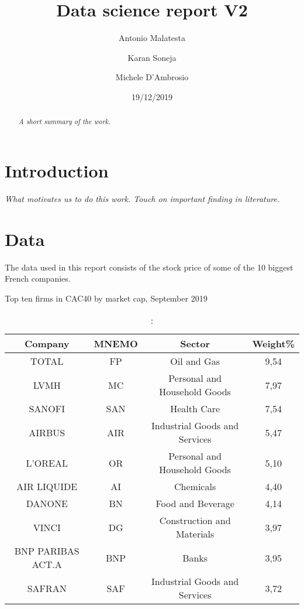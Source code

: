 \documentclass[
  11pt,
]{article}
\title{Data science report V2}
\author{Antonio Malatesta \and Karan Soneja \and Michele D'Ambrosio}
\date{19/12/2019}
\begin{document}
\maketitle
\begin{abstract}
\emph{A short summary of the work.}
\end{abstract}

{
\setcounter{tocdepth}{3}
\tableofcontents
}
\newpage

\hypertarget{introduction}{%
\section{Introduction}\label{introduction}}

\emph{What motivates us to do this work. Touch on important finding in
literature. }

\hypertarget{data}{%
\section{Data}\label{data}}

The data used in this report consists of the stock price of some of the
10 biggest French companies.

\begin{table}[ht]
\caption:{Top ten firms in CAC40 by market cap, September 2019}
\centering
\begin{tabular}{|c|c|c|c|}
  \hline
Company & MNEMO  &  Sector  & Weight\% \\
  \hline
  TOTAL &   FP  & Oil and Gas & 9,54 \\
  LVMH &    MC  & Personal and Household Goods & 7,97 \\
  SANOFI & SAN  & Health Care & 7,54 \\
  AIRBUS & AIR  & Industrial Goods and Services &   5,47 \\
  L'OREAL   & OR  & Personal and Household Goods &  5,10 \\
  AIR LIQUIDE & AI  & Chemicals &   4,40 \\
  DANONE &  BN  & Food and Beverage & 4,14 \\
  VINCI &   DG & Construction and Materials & 3,97 \\
  BNP PARIBAS ACT.A &   BNP  & Banks & 3,95 \\
  SAFRAN & SAF  & Industrial Goods and Services & 3,72 \\
   \hline
  \end{tabular}
\end{table}
\end{document}

